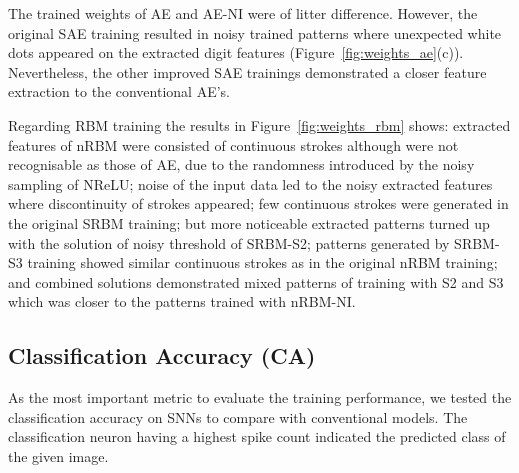 The trained weights of AE and AE-NI were of litter difference.
However, the original SAE training resulted in noisy trained patterns where unexpected white dots appeared on the extracted digit features (Figure~\ref{fig:weights_ae}(c)).
Nevertheless, the other improved SAE trainings demonstrated a closer feature extraction to the conventional AE's.



Regarding RBM training
the results in Figure~\ref{fig:weights_rbm} shows:
extracted features of nRBM were consisted of continuous strokes although were not recognisable as those of AE, due to the randomness introduced by the noisy sampling of NReLU;
noise of the input data led to the noisy extracted features where discontinuity of strokes appeared;
few continuous strokes were generated in the original SRBM training;
but more noticeable extracted patterns turned up with the solution of noisy threshold of SRBM-S2;
patterns generated by SRBM-S3 training showed similar continuous strokes as in the original nRBM training;
and combined solutions demonstrated mixed patterns of training with S2 and S3 which was closer to the patterns trained with nRBM-NI. 


\subsection{Classification Accuracy (CA)}
As the most important metric to evaluate the training performance, we tested the classification accuracy on SNNs to compare with conventional models.
The classification neuron having a highest spike count indicated the predicted class of the given image.

